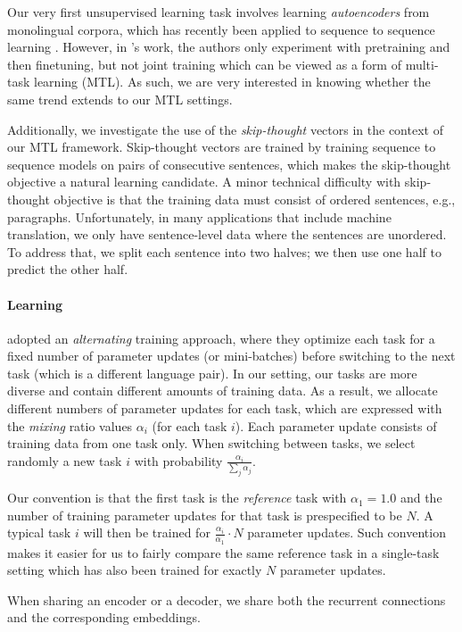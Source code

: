 Our very first unsupervised learning task involves learning {\it autoencoders} from
monolingual corpora, which has recently been applied to sequence to sequence
learning \citep{dai15}. However, in \citet{dai15}'s work, the authors
only experiment with pretraining and then finetuning, but not joint training which
can be viewed as a form of multi-task learning (MTL). As such, we are
very interested in knowing whether the same trend extends to our MTL settings.

Additionally, we investigate the use of the {\it skip-thought}
vectors \citep{kiros15skip} in the context of our MTL framework.
Skip-thought vectors are trained by training sequence to sequence
models on pairs of consecutive sentences, which makes the skip-thought
objective a natural \ssl{} learning candidate. A minor technical
difficulty with skip-thought objective is that 
the training data must consist of ordered sentences, e.g., paragraphs.  Unfortunately, in
many applications that include machine translation, we only have
sentence-level data where the sentences are unordered. To
address that, we split each sentence into two halves; we then use 
one half to predict the other half.

\paragraph{Learning}
\cite{dong15} adopted an {\it alternating} training approach, where they
optimize each task for a fixed number of parameter updates (or
mini-batches) before switching to the next task (which is a different
language pair). In our setting, our tasks are more diverse and contain
different amounts of training data. As a result, we allocate different
numbers of parameter updates for each task, which are expressed with
the {\it mixing} ratio values $\alpha_i$ (for each task $i$). Each
parameter update consists of training data from one task only. When
switching between tasks, we select randomly a new task $i$ with
probability $\frac{\alpha_i}{\sum_j \alpha_j}$.


Our convention is that the first task is the
{\it reference} task with $\alpha_1 = 1.0$ and the number of training
parameter updates for that task is prespecified to be $N$. A typical task $i$ will then be
trained for $\frac{\alpha_i}{\alpha_1}\cdot N$ parameter updates.
Such convention makes it easier for us to fairly compare the same reference
task in a single-task setting which has also been trained for exactly $N$
parameter updates.

When sharing an encoder or a decoder, we share both the recurrent connections
and the corresponding embeddings.



